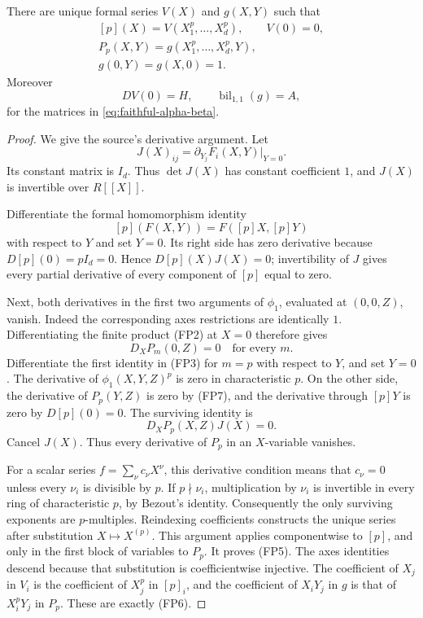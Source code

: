 \begin{srlemma}\label{lem:faithful-formal-Frobenius-factor}
There are unique formal series \(V(X)\) and \(g(X,Y)\)
such that
\[
 \begin{gathered}
 [p](X)=V(X_1^p,\ldots,X_d^p),\qquad V(0)=0,\\
 P_p(X,Y)=g(X_1^p,\ldots,X_d^p,Y),\\
                         g(0,Y)=g(X,0)=1.
 \end{gathered}
 \tag{FP5}\label{eq:faithful-Frobenius-factorizations}
\]
Moreover
\[
                       DV(0)=H,\qquad
                     \operatorname{bil}_{1,1}(g)=A,
 \tag{FP6}\label{eq:faithful-Frobenius-coefficients}
\]
for the matrices in \eqref{eq:faithful-alpha-beta}.
\end{srlemma}
\begin{proof}
We give the source's derivative argument.
Let
\[
                    J(X)_{ij}=
                           \partial_{Y_j}F_i(X,Y)|_{Y=0}.
\]
Its constant matrix is \(I_d\).
Thus \(\det J(X)\) has constant coefficient \(1\), and
\(J(X)\) is invertible over \(R[[X]]\).

Differentiate the formal homomorphism identity
\[
              [p](F(X,Y))=F([p]X,[p]Y)
\]
with respect to \(Y\) and set \(Y=0\).
Its right side has zero derivative because
\(D[p](0)=pI_d=0\).
Hence \(D[p](X)J(X)=0\); invertibility of \(J\) gives
every partial derivative of every component of \([p]\)
equal to zero.

Next, both derivatives in the first two arguments of
\(\phi_1\), evaluated at \((0,0,Z)\), vanish.
Indeed the corresponding axes restrictions are identically
\(1\).  Differentiating the finite product (FP2) at \(X=0\)
therefore gives
\[
                             D_XP_m(0,Z)=0
                                  \quad\text{for every }m.
 \tag{FP7}\label{eq:faithful-Pm-first-derivative}
\]
Differentiate the first identity in (FP3) for \(m=p\)
with respect to \(Y\), and set \(Y=0\).
The derivative of \(\phi_1(X,Y,Z)^p\) is zero in
characteristic \(p\).
On the other side, the derivative of \(P_p(Y,Z)\)
is zero by (FP7), and the derivative through \([p]Y\)
is zero by \(D[p](0)=0\).
The surviving identity is
\[
                            D_XP_p(X,Z)J(X)=0.
\]
Cancel \(J(X)\).
Thus every derivative of \(P_p\) in an \(X\)-variable
vanishes.

For a scalar series \(f=\sum_\nu c_\nu X^\nu\), this
derivative condition means that \(c_\nu=0\) unless every
\(\nu_i\) is divisible by \(p\).
If \(p\nmid\nu_i\), multiplication by \(\nu_i\) is
invertible in every ring of characteristic \(p\),
by Bezout's identity.
Consequently the only surviving exponents are \(p\)-multiples.
Reindexing coefficients constructs the unique series
after substitution \(X\mapsto X^{(p)}\).
This argument applies componentwise to \([p]\), and
only in the first block of variables to \(P_p\).
It proves (FP5).
The axes identities descend because that substitution
is coefficientwise injective.
The coefficient of \(X_j\) in \(V_i\) is the coefficient
of \(X_j^p\) in \([p]_i\), and the coefficient of \(X_iY_j\)
in \(g\) is that of \(X_i^pY_j\) in \(P_p\).
These are exactly (FP6).
\end{proof}

